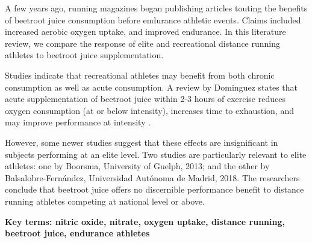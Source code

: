 \begin{tcolorbox}[title=Abstract,colbacktitle=white!80!black,coltitle=black,arc=0mm,boxrule=0.1mm]
A few years ago, running magazines began publishing articles touting the benefits of beetroot juice consumption before endurance athletic events. Claims included increased aerobic oxygen uptake, and improved endurance.
In this literature review, we compare the response of elite and recreational distance running athletes to beetroot juice supplementation. 

Studies indicate that recreational athletes may benefit from both chronic consumption as well as acute consumption. A review by Dominguez states that acute supplementation of beetroot juice within 2-3 hours of exercise reduces oxygen consumption (at or below \votmax intensity), increases time to exhaustion, and may improve performance at \votmax intensity%
.

However, some newer studies suggest that these effects are insignificant in subjects performing at an elite level. Two studies are particularly relevant to elite athletes: one by Boorsma, University of Guelph, 2013; and the other by Balsalobre-Fern\'andez, Universidad Aut\'onoma de Madrid, 2018. The researchers conclude that beetroot juice offers no discernible performance benefit to distance running athletes competing at national level or above.
\vspace{5mm}

\textbf{Key terms: nitric oxide, nitrate, oxygen uptake, distance running, beetroot juice, endurance athletes} 
\end{tcolorbox}